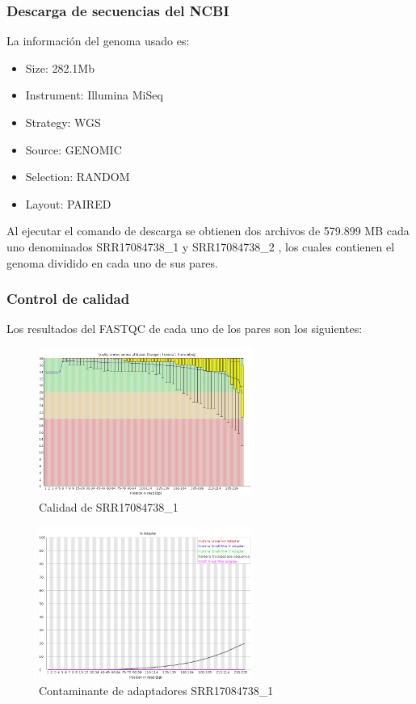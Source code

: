 \documentclass[journal, letterpaper, 11pt]{IEEEtran}
\begin{document}
\subsubsection{Descarga de secuencias del NCBI}
La información del genoma usado es:

\begin{itemize}
\item Size: 282.1Mb
\item Instrument: Illumina MiSeq
\item Strategy: WGS
\item Source: GENOMIC 
\item Selection: RANDOM
\item Layout: PAIRED
\end{itemize}
Al ejecutar el comando de descarga se obtienen dos archivos de 579.899 MB cada uno denominados SRR17084738\_1 y SRR17084738\_2 , los cuales contienen el genoma dividido en cada uno de sus pares. \linebreak

\subsubsection{Control de calidad}
Los resultados del FASTQC de cada uno de los pares son los siguientes:
\begin{figure}[H]
\centering
\includegraphics[width=7cm]{Imagenes/fastqc_original_1_2.png}
\caption{Calidad de SRR17084738\_1}
\end{figure}
\begin{figure}[H]
\centering
\includegraphics[width=7cm]{Imagenes/fastqc_original_1_1.png}
\caption{Contaminante de adaptadores SRR17084738\_1}
\end{figure}
\end{document}
